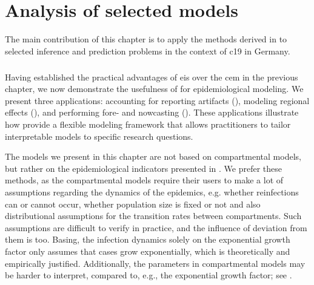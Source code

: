 \chapter{Analysis of selected models}
\label{cha:analysis_of_selected_models}
\newpage
\begin{tcolorbox}[title={Contributions of this chapter}]
    The main contribution of this chapter is to apply the methods derived in  to selected inference and prediction problems in the context of \acrshort{c19} in Germany.
    \paragraph{}
    \phantom{stuff}
    \paragraph{}
    \phantom{stuff}
    \paragraph{}
    \phantom{stuff}
\end{tcolorbox}
\newpage
Having established the practical advantages of \acrshort{eis} over the \acrshort{cem} in the previous chapter, we now demonstrate the usefulness of  for epidemiological modeling. We present three applications: accounting for reporting artifacts (), modeling regional effects (), and performing fore- and nowcasting (). These applications illustrate how  provide a flexible modeling framework that allows practitioners to tailor interpretable models to specific research questions.

The models we present in this chapter are not based on compartmental models, but rather on the epidemiological indicators presented in . We prefer these methods, as the compartmental models require their users to make a lot of assumptions regarding the dynamics of the epidemics, e.g. whether reinfections can or cannot occur, whether population size is fixed or not and also distributional assumptions for the transition rates between compartments. 
Such assumptions are difficult to verify in practice, and the influence of deviation from them is too. Basing, the infection dynamics solely on the exponential growth factor only assumes that cases grow exponentially, which is theoretically and empirically justified. 
Additionally, the parameters in compartmental models may be harder to interpret, compared to, e.g., the exponential growth factor; see .

